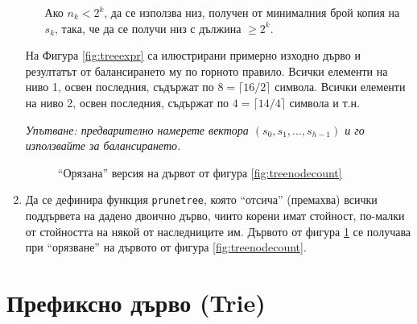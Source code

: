 \begin{enumerate}[resume]
\begin{enumerate}[label=\alph*)]
    Ако $n_k < 2^k$, да се използва низ, получен от минималния брой копия на $s_k$, така, че да се получи низ с дължина $\geq 2^k$.
  \end{enumerate}

  На Фигура \ref{fig:treeexpr} са илюстрирани примерно изходно дърво и резултатът от балансирането му по горното правило. Всички елементи на ниво 1, освен последния, съдържат по $8=\lceil{16/2}\rceil$ символа. Всички елементи на ниво 2, освен последния, съдържат по $4=\lceil{14/4}\rceil$ символа и т.н.


  \emph{Упътване: предварително намерете вектора $(s_0,s_1,...,s_{h-1})$ и го използвайте за балансирането.}
   
  \begin{figure}
    \centering
    \caption{``Орязана'' версия на дървот от фигура \ref{fig:treenodecount}}
    \label{fig:pruned}
    \end{figure}
  
  


  \item Да се дефинира функция \texttt{prunetree}, която ``отсича'' (премахва) всички поддървета на дадено двоично дърво, чиито корени имат стойност, по-малки от стойността на някой от наследниците им. Дървото от фигура \ref{fig:pruned} се получава при ``орязване'' на дървото от фигура \ref{fig:treenodecount}.
\end{enumerate}

\pagebreak

\section{Префиксно дърво (Trie)}



